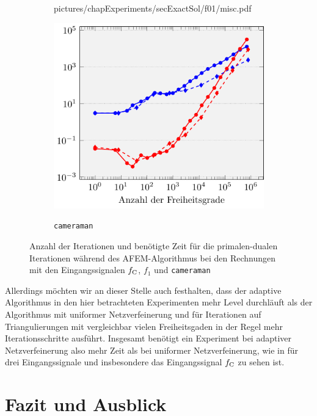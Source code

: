 \begin{figure}[p]
\begin{subfigure}{.32\linewidth}
      {pictures/chapExperiments/secExactSol/f01/misc.pdf}
    \label{fig:miscF01}
  \end{subfigure}
  \begin{subfigure}{.32\linewidth}
    \centering
    \caption{\texttt{cameraman}}
    \includegraphics[width=\linewidth]
      {pictures/chapExperiments/secGrayscale/cam/misc.pdf}
    \label{fig:miscCam}
  \end{subfigure}
  \caption{Anzahl der Iterationen und benötigte Zeit für die primalen-dualen
    Iterationen während des AFEM-Algorithmus bei den Rechnungen
    mit den Eingangssignalen $f_\textup{C}$, $f_1$ und \texttt{cameraman}}
  \label{fig:miscInSi}
\end{figure}
Allerdings möchten wir an dieser Stelle auch festhalten, dass der adaptive
Algorithmus in den hier betrachteten Experimenten mehr Level durchläuft als der
Algorithmus mit uniformer Netzverfeinerung und für Iterationen auf
Triangulierungen mit vergleichbar vielen Freiheitsgaden in der Regel mehr
Iterationsschritte ausführt. 
Insgesamt benötigt ein Experiment bei adaptiver Netzverfeinerung also mehr Zeit
als bei uniformer Netzverfeinerung, wie in  für drei
Eingangssignale und insbesondere das Eingangssignal $f_\textup{C}$ zu sehen
ist.


\section{Fazit und Ausblick}

